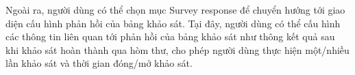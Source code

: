 Ngoài ra, người dùng có thể chọn mục Survey response để chuyển hướng tới giao diện cấu hình phản hồi của bảng khảo sát. Tại đây, người dùng có thể cấu hình các thông tin liên quan tới phản hồi của bảng khảo sát như thông kết quả sau khi khảo sát hoàn thành qua hòm thư, cho phép người dùng thực hiện một/nhiều lần khảo sát và thời gian đóng/mở khảo sát.